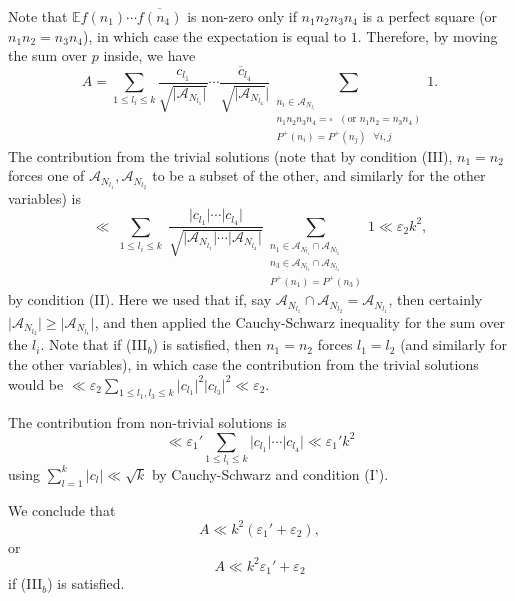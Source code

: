 \documentclass[11pt]{tran-l}
\theoremstyle{definition}
\theoremstyle{remark}
\numberwithin{equation}{section}
\begin{document}
Note that $\mathbb Ef(n_1)\cdots \overline{f(n_4)}$ is non-zero only if $n_1n_2n_3n_4$ is a perfect square (or $n_1n_2=n_3n_4$), in which case the expectation is equal to $1$. Therefore, by moving the sum over $p$ inside, we have 
\begin{equation*}
    A = \sum_{1\leq l_i\leq k} \frac{c_{l_1}}{\sqrt{\lvert\mathcal A_{N_{l_1}}\rvert}}\cdots \frac{\overline{c}_{l_4}}{\sqrt{\lvert\mathcal A_{N_{l_4}}}\rvert}\sum_{\substack{n_i\in\mathcal A_{N_{l_i}} \\ n_1n_2n_3n_4 = \square \text{ }(\text{or } n_1n_2=n_3n_4) \\ P^+ (n_i) = P^+ (n_j) \text{ }\forall i, j }}1.
\end{equation*}
The contribution from the trivial solutions (note that by condition (III), $n_1=n_2$ forces one of $\mathcal A_{N_{l_1}}, \mathcal A_{N_{l_2}}$ to be a subset of the other, and similarly for the other variables) is 
\begin{equation*}
\ll  \sum_{\substack{1\leq l_i\leq k }} \frac{\lvert c_{l_1}\rvert\cdots \lvert c_{l_4}\rvert}{\sqrt{\lvert \mathcal A_{N_{l_1}}\rvert\cdots \lvert\mathcal A_{N_{l_4}}\rvert}}\sum_{\substack{n_1\in\mathcal A_{N_{l_1}}\cap \mathcal A_{N_{l_2}} \\ n_3\in\mathcal A_{N_{l_3}}\cap \mathcal A_{N_{l_4}} \\ P^+(n_1) = P^+(n_3)}} 1\ll \varepsilon_2k^2, 
\end{equation*}
by condition (II). Here we used that if, say $\mathcal A_{N_{l_1}}\cap \mathcal A_{N_{l_2}} = \mathcal A_{N_{l_1}}$, then certainly $\lvert\mathcal A_{N_{l_2}}\rvert\geq\lvert\mathcal A_{N_{l_1}}\rvert$, and then applied the Cauchy-Schwarz inequality for the sum over the $l_i$. Note that if (III$_b$) is satisfied, then $n_1=n_2$ forces $l_1=l_2$ (and similarly for the other variables), in which case the contribution from the trivial solutions would be $\ll\varepsilon_2 \sum_{1\leq l_1, l_3\leq k} \lvert c_{l_1}\rvert^2\lvert c_{l_3}\rvert^2\ll \varepsilon_2.$

The contribution from non-trivial solutions is
\begin{equation*}
    \ll\varepsilon_1' \sum_{1\leq l_i\leq k} \lvert c_{l_1}\rvert\cdots \lvert c_{l_4}\rvert \ll \varepsilon_1'k^2 
\end{equation*}
using $\sum_{l=1}^k \lvert c_{l}\rvert\ll\sqrt k$ by Cauchy-Schwarz and condition (I'). 


We conclude that
\begin{equation}\label{eq:Abound}
    A \ll k^2(\varepsilon_1'  + \varepsilon_2),
\end{equation}
or 
\begin{equation}\label{eq:AboundDisjoint}
    A\ll k^2\varepsilon_1' + \varepsilon_2
\end{equation}
if (III$_b$) is satisfied. 
\end{document}
